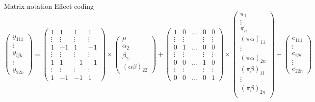 \documentclass[aspectratio=169]{beamer}
\begin{document}
\begin{frame}{Matrix notation}
{Effect coding}
\[
  \begin{pmatrix}
    y_{111}\\
    \vdots\\
    y_{ijk}\\
    \vdots\\
    y_{22n}
  \end{pmatrix}
=
  \begin{pmatrix}
    1 & 1 & 1 & 1\\
    \vdots & \vdots & \vdots & \vdots \\
    1 & -1 & 1 & -1\\
    \vdots & \vdots & \vdots & \vdots \\
    1 & 1 & -1 & -1\\
    \vdots & \vdots & \vdots & \vdots \\
    1 & -1 & -1 & 1
  \end{pmatrix}
\times
  \begin{pmatrix}
    \mu\\
    \alpha_2\\
    \beta_2\\
    (\alpha\beta)_{22}
  \end{pmatrix}
+
  \begin{pmatrix}
    1 & 0 & \dots & 0 & 0\\
    \vdots & \vdots && \vdots & \vdots \\
    0 & 1 & \dots & 0 & 0\\
    \vdots & \vdots && \vdots & \vdots \\
    0 & 0 & \dots & 1 & 0\\
    \vdots & \vdots && \vdots & \vdots \\
    0 & 0 & \dots & 0 & 1
  \end{pmatrix}
\times
  \begin{pmatrix}
    \pi_1\\
    \vdots\\
    \pi_n\\
    (\pi\alpha)_{11}\\
    \vdots\\
    (\pi\alpha)_{2n}\\
    (\pi\beta)_{11}\\
    \vdots\\
    (\pi\beta)_{2n}\\
  \end{pmatrix}
+
  \begin{pmatrix}
    e_{111}\\
    \vdots\\
    e_{ijk}\\
    \vdots\\
    e_{22n}
  \end{pmatrix}
\]
\end{frame}
\end{document}
